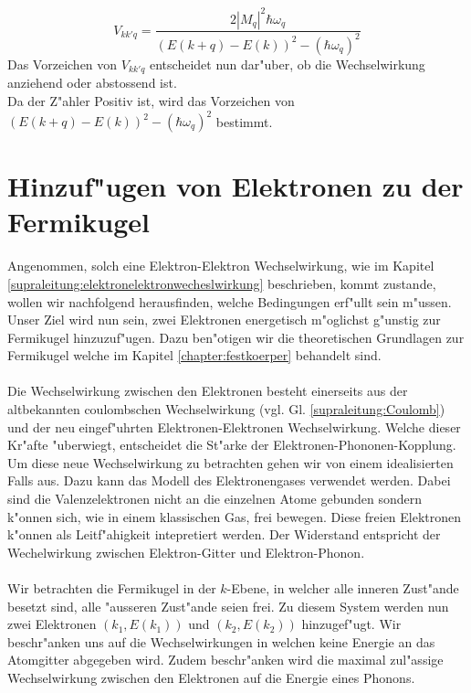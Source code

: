 \begin{refsection}
\begin{equation}
V_{kk'q} =
\frac
{2|M_q|^2\hbar\omega_q}
{(E(k+q)-E(k))^2-(\hbar\omega_q)^2}
\label{supraleitung:Wechelwirkung_Vkk'q_Kurz}
\end{equation}
Das Vorzeichen von $V_{kk'q}$ entscheidet nun dar"uber, ob die Wechselwirkung anziehend oder abstossend ist.\\
Da der Z"ahler Positiv ist, wird das Vorzeichen von $(E(k+q)-E(k))^2-(\hbar\omega_q)^2$ bestimmt.

\section{Hinzuf"ugen von Elektronen zu der Fermikugel}
Angenommen, solch eine Elektron-Elektron Wechselwirkung, wie im Kapitel \ref{supraleitung:elektronelektronwecheslwirkung} beschrieben, kommt zustande, wollen wir nachfolgend herausfinden, welche Bedingungen erf"ullt sein m"ussen.
\\
Unser Ziel wird nun sein, zwei Elektronen energetisch m"oglichst g"unstig zur Fermikugel hinzuzuf"ugen. Dazu ben"otigen wir die theoretischen Grundlagen zur Fermikugel welche im Kapitel \ref{chapter:festkoerper} behandelt sind.
\\
\\
Die Wechselwirkung zwischen den Elektronen besteht einerseits aus der altbekannten coulombschen Wechselwirkung (vgl. Gl. \ref{supraleitung:Coulomb}) und der neu eingef"uhrten Elektronen-Elektronen Wechselwirkung. Welche dieser Kr"afte "uberwiegt, entscheidet die St"arke der Elektronen-Phononen-Kopplung.
\\
Um diese neue Wechselwirkung zu betrachten gehen wir von einem idealisierten Falls aus. Dazu kann das Modell des Elektronengases verwendet werden. Dabei sind die Valenzelektronen nicht an die einzelnen Atome gebunden sondern k"onnen sich, wie in einem klassischen Gas, frei bewegen. Diese freien Elektronen k"onnen als Leitf"ahigkeit intepretiert werden. Der Widerstand entspricht der Wechelwirkung zwischen Elektron-Gitter und Elektron-Phonon.
\\
\\
Wir betrachten die Fermikugel in der $k$-Ebene, in welcher alle inneren Zust"ande besetzt sind, alle "ausseren Zust"ande seien frei. Zu diesem System werden nun zwei Elektronen $(k_1,E(k_1))$ und $(k_2,E(k_2))$ hinzugef"ugt. Wir beschr"anken uns auf die Wechselwirkungen in welchen keine Energie an das Atomgitter abgegeben wird. Zudem beschr"anken wird die maximal zul"assige Wechselwirkung zwischen den Elektronen auf die Energie eines Phonons.


\end{refsection}
